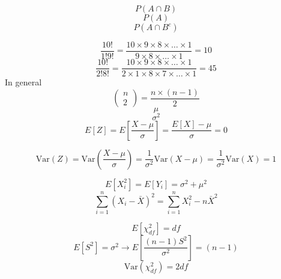 \documentclass[aspectratio=169]{beamer}
\newcommand{\Var}{\mathrm{Var}}
\begin{document}
\begin{frame}
$$
P(A\cap B)
$$
$$
P(A)
$$
$$
P(A\cap B^c)
$$
\end{frame}

\begin{frame}
$$
\frac{10!}{1!9!} = \frac{10\times 9 \times 8 \times \ldots \times 1}{9 \times 8 \times \ldots \times 1} = 10
$$
$$
\frac{10!}{2!8!} = \frac{10\times 9 \times 8 \times \ldots \times 1}{2 \times 1 \times 8 \times 7 \times \ldots \times 1} = 45
$$
In general
$$
\left(
\begin{array}{c}
n \\ 2
\end{array}
\right)
= 
\frac{n \times (n - 1)}{2}
$$
$$
\mu 
$$
$$
\sigma^2
$$
$$
E[Z] = E\left[\frac{X - \mu}{\sigma} \right] = \frac{E[X] - \mu}{\sigma}  = 0
$$
\end{frame}

\begin{frame}
$$
\Var(Z) = \Var\left(\frac{X - \mu}{\sigma}\right) = \frac{1}{\sigma^2} \Var(X - \mu) = \frac{1}{\sigma^2} \Var(X) = 1
$$
\end{frame}

\begin{frame}
$$
E[X_i^2] = E[Y_i] = \sigma^2 + \mu^2
$$
$$
\sum_{i=1}^n (X_i - \bar X)^2 = \sum_{i=1}^n X_i^2 - n \bar X ^ 2 
$$
\end{frame}

\begin{frame}
$$
E[\chi^2_{df}] = df
$$
$$
E[S^2] = \sigma^2
\rightarrow 
E\left[\frac{(n-1)S^2}{\sigma^2}\right] = (n-1)
$$
$$
\Var(\chi^2_{df}) = 2df
$$
\end{frame}
\end{document}
